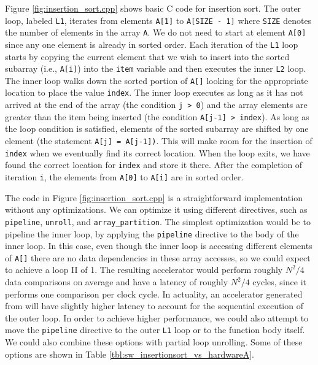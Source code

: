 Figure \ref{fig:insertion_sort.cpp} shows basic C code for insertion sort. The outer loop, labeled \lstinline{L1}, iterates from elements \lstinline{A[1]} to \lstinline{A[SIZE - 1]} where \lstinline{SIZE} denotes the number of elements in the array \lstinline{A}. We do not need to start at element \lstinline{A[0]} since any one element is already in sorted order. Each iteration of the \lstinline{L1} loop starts by copying the current element that we wish to insert into the sorted subarray (i.e., \lstinline{A[i]}) into the \lstinline{item} variable and then executes the inner \lstinline{L2} loop. The inner loop walks down the sorted portion of \lstinline{A[]} looking for the appropriate location to place the value \lstinline{index}. The inner loop executes as long as it has not arrived at the end of the array (the condition \lstinline{j > 0}) and the array elements are greater than the item being inserted (the condition \lstinline{A[j-1] > index}). As long as the loop condition is satisfied, elements of the sorted subarray are shifted by one element (the statement \lstinline{A[j] = A[j-1])}. This will make room for the insertion of \lstinline{index} when we eventually find its correct location. When the loop exits, we have found the correct location for \lstinline{index} and store it there. After the completion of iteration \lstinline{i}, the elements from \lstinline{A[0]} to \lstinline{A[i]} are in sorted order.

The code in Figure \ref{fig:insertion_sort.cpp} is a straightforward implementation without any optimizations. We can optimize it using different \VHLS directives, such as \lstinline{pipeline}, \lstinline{unroll}, and \lstinline{array_partition}. The simplest optimization would be to pipeline the inner loop, by applying the \lstinline{pipeline} directive to the body of the inner loop.  In this case, even though the inner loop is accessing different elements of \lstinline{A[]} there are no data dependencies in these array accesses, so we could expect to achieve a loop II of 1. The resulting accelerator would perform roughly $N^2/4$ data comparisons\cite{sedgewickalgorithmsinC} on average and have a latency of roughly $N^2/4$ cycles, since it performs one comparison per clock cycle.  In actuality, an accelerator generated from \VHLS will have slightly higher latency to account for the sequential execution of the outer loop.   In order to achieve higher performance, we could also attempt to move the \lstinline{pipeline} directive to the outer \lstinline{L1} loop or to the function body itself.  We could also combine these options with partial loop unrolling.  Some of these options are shown in Table \ref{tbl:sw_insertionsort_vs_hardwareA}.

